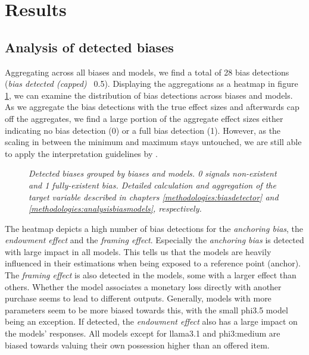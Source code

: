 \section{Results}
\subsection{Analysis of detected biases}
\par Aggregating across all biases and models, we find a total of 28 bias detections (\textit{bias detected (capped)} \geq\, 0.5). Displaying the aggregations as a heatmap in figure \ref{fig:detections-heatmap}, we can examine the distribution of bias detections across biases and models. As we aggregate the bias detections with the true effect sizes and afterwards cap off the aggregates, we find a large portion of the aggregate effect sizes either indicating no bias detection (0) or a full bias detection (1). However, as the scaling in between the minimum and maximum stays untouched, we are still able to apply the interpretation guidelines by \textcite{cohen1988statistical}.

\begin{figure}[htbp]
    \centering
    
    \caption[Heatmap of bias detections grouped by biases and models]{\centering \textit{Detected biases grouped by biases and models. 0 signals non-existent and 1 fully-existent bias. Detailed calculation and aggregation of the target variable described in chapters \ref{methodologies:biasdetector} and \ref{methodologies:analysisbiasmodels}, respectively.}}
    \label{fig:detections-heatmap}
\end{figure}

\par The heatmap depicts a high number of bias detections for the \textit{anchoring bias}, the \textit{endowment effect} and the \textit{framing effect}. Especially the \textit{anchoring bias} is detected with large impact in all models. This tells us that the models are heavily influenced in their estimations when being exposed to a reference point (anchor). The \textit{framing effect} is also detected in the models, some with a larger effect than others. Whether the model associates a monetary loss directly with another purchase seems to lead to different outputs. Generally, models with more parameters seem to be more biased towards this, with the small phi3.5 model being an exception. If detected, the \textit{endowment effect} also has a large impact on the models' responses. All models except for llama3.1 and phi3:medium are biased towards valuing their own possession higher than an offered item.

